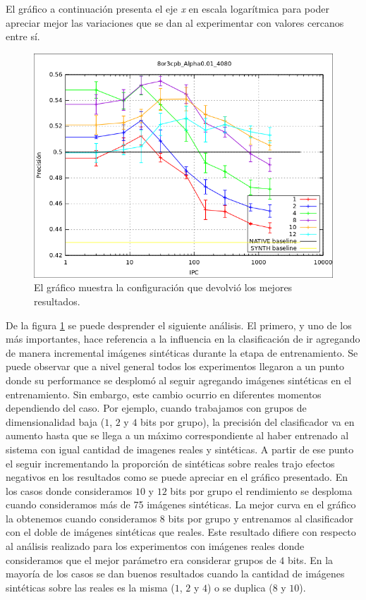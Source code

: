 	El gráfico a continuación presenta el eje \textit{x} en escala logarítmica para poder apreciar mejor las variaciones que se dan al experimentar con valores cercanos entre sí.
	
			\begin{figure}[!htbp]
				\centering
				\includegraphics[scale=0.6]{img/resultados/mixtas/best_mean.png}
				\caption[Mixtas media mejor resultado]{El gráfico muestra la configuración que devolvió los mejores resultados.}
				\label{fig: Mixtas-media-mejor}
			\end{figure}

	De la figura \ref{fig: Mixtas-media-mejor} se puede desprender el siguiente análisis. El primero, y uno de los más importantes, hace referencia a la influencia en la clasificación de ir agregando de manera incremental imágenes sintéticas durante la etapa de entrenamiento. Se puede observar que a nivel general todos los experimentos llegaron a un punto donde su performance se desplomó al seguir agregando imágenes sintéticas en el entrenamiento. Sin embargo, este cambio ocurrio en diferentes momentos dependiendo del caso. Por ejemplo, cuando trabajamos con grupos de dimensionalidad baja ($1$, $2$ y $4$ bits por grupo), la precisión del clasificador va en aumento hasta que se llega a un máximo correspondiente al haber entrenado al sistema con igual cantidad de imagenes reales y sintéticas. A partir de ese punto el seguir incrementando la proporción de sintéticas sobre reales trajo efectos negativos en los resultados como se puede apreciar en el gráfico presentado. En los casos donde consideramos $10$ y $12$ bits por grupo el rendimiento se desploma cuando consideramos más de 75 imágenes sintéticas. La mejor curva en el gráfico la obtenemos cuando consideramos $8$ bits por grupo y entrenamos al clasificador con el doble de imágenes sintéticas que reales. Este resultado difiere con respecto al análisis realizado para los experimentos con imágenes reales donde consideramos que el mejor parámetro era considerar grupos de $4$ bits. En la mayoría de los casos se dan buenos resultados cuando la cantidad de imágenes sintéticas sobre las reales es la misma ($1$, $2$ y $4$) o se duplica ($8$ y $10$).
	
